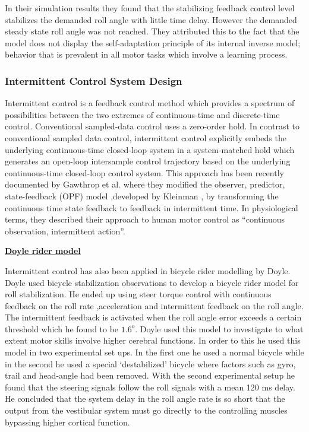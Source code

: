 \par
In their simulation results they found that the stabilizing feedback control level stabilizes the demanded roll angle with little time delay. However the demanded steady state roll angle was not reached. They attributed this to the fact that  the model does not display the self-adaptation principle of its internal inverse model; behavior that is prevalent in all motor tasks which involve a learning process.
\subsubsection{Intermittent Control System Design}

Intermittent control is a feedback control method which provides a spectrum of possibilities between the two extremes of continuous-time and discrete-time control. Conventional sampled-data control uses a zero-order hold. In contrast to conventional sampled data control, intermittent control explicitly embeds the underlying continuous-time closed-loop system in a system-matched hold which generates an open-loop intersample control trajectory based on the underlying continuous-time closed-loop control system. This approach has been recently documented by Gawthrop et al. \cite{gawthrop2014intermittent} where they modified the observer, predictor, state-feedback (OPF) model ,developed by Kleinman  \cite{kleinman1970optimal}, by transforming the continuous time state feedback to feedback in intermittent time. In physiological terms, they  described their approach to human motor control as “continuous observation, intermittent action”.

\bigbreak
\underline{\textbf{Doyle rider model\cite{doyle1988}}}
\newline
\par
Intermittent control has also been applied in bicycle rider modelling by Doyle. Doyle used bicycle stabilization observations to develop a bicycle rider model for roll stabilization. He ended up using steer torque control with continuous feedback on the roll rate ,acceleration and intermittent feedback on the roll angle. The intermittent feedback is activated when the roll angle error exceeds a certain threshold which he found to be \ensuremath{1.6^o}. Doyle used this model to investigate to what extent motor skills involve higher cerebral functions. In order to this he used this model in two experimental set ups. In the first one he used a normal bicycle while in the second he used a special ‘destabilized’ bicycle where factors such as gyro, trail and head-angle had been removed. With the second experimental setup he found that the steering signals follow the roll signals with a mean 120 ms delay. He concluded that the system delay in the roll angle rate is so short that  the output from the vestibular system must go directly to the controlling muscles bypassing higher cortical function.

